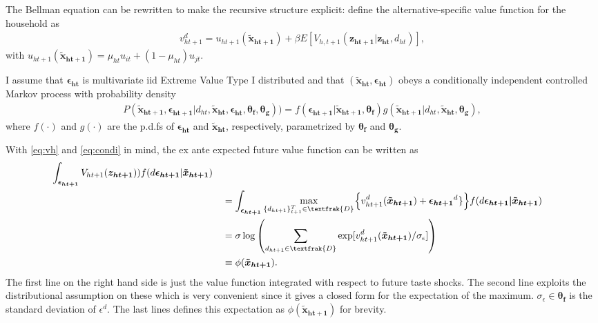 The Bellman equation can be rewritten to make the recursive structure explicit: define the alternative-specific value function for the household as
\begin{align}
v_{ht+1}^d=u_{ht+1}(\boldsymbol{\tilde{x}_{ht+1}})+\beta E[V_{h,t+1}(\boldsymbol{z_{ht+1}}|\boldsymbol{z_{ht}},d_{ht})],
\label{eq:vh}
\end{align}
with $u_{ht+1}(\boldsymbol{\tilde{x}_{ht+1}})=\mu_{ht} u_{it}+(1-\mu_{ht})u_{jt}$. 

I assume that $\boldsymbol{\epsilon_{ht}}$ is multivariate iid Extreme Value Type I distributed and that $(\boldsymbol{\tilde{x}_{ht}},\boldsymbol{\epsilon_{ht}})$ obeys a conditionally independent controlled Markov process with probability density
\begin{align}
P(\boldsymbol{\tilde{x}_{ht+1}},\boldsymbol{\epsilon_{ht+1}}|d_{ht},\boldsymbol{\tilde{x}_{ht}},\boldsymbol{\epsilon_{ht}},\boldsymbol{\theta_f},\boldsymbol{\theta_g}))=f(\boldsymbol{\epsilon_{ht+1}}|\boldsymbol{\tilde{x}_{ht+1}},\boldsymbol{\theta_f})g(\boldsymbol{\tilde{x}_{ht+1}}|d_{ht},\boldsymbol{\tilde{x}_{ht}},\boldsymbol{\theta_g}),
\label{eq:condi}
\end{align}
where $f(\cdot)$ and $g(\cdot)$ are the p.d.fs of $\boldsymbol{\epsilon_{ht}}$ and $\boldsymbol{\tilde{x}_{ht}}$, respectively, parametrized by $\boldsymbol{\theta_f}$ and $\boldsymbol{\theta_g}$.

With \eqref{eq:vh} and \eqref{eq:condi} in mind, the ex ante expected future value function can be written as
\begin{alignat*}{3}
\int_{\boldsymbol{\epsilon_{ht+1}}}{ V_{ht+1}(\boldsymbol{z_{ht+1}}))f(d\boldsymbol{\epsilon_{ht+1}}|\boldsymbol{\tilde{x}_{ht+1}})} \\
& &&= \int_{\boldsymbol{\epsilon_{ht+1}}}{ \max_{\{d_{ht+1}\}_{t+1}^{T}\in \textfrak{D}_{}} } \Big\{v_{ht+1}^{d_{}}(\boldsymbol{\tilde{x}_{ht+1}}) +\boldsymbol{\epsilon_{ht+1}}^{d_{}}\} \Big\}f(d\boldsymbol{\epsilon_{ht+1}|\tilde{x}_{ht+1}}) \\
& &&=\sigma \log {\left( \sum_{d_{ht+1} \in \textfrak{D}} { \exp[v_{ht+1}^{d_{}}(\boldsymbol{\tilde{x}_{ht+1}})/ \sigma_{\epsilon}]  } \right)} \\
& &&\equiv\phi(\boldsymbol{\tilde{x}_{ht+1}}). 
\end{alignat*}
The first line on the right hand side is just the value function integrated with respect to future taste shocks. The second line exploits the distributional assumption on these which is very convenient since it gives a closed form for the expectation of the maximum. $\sigma_{\epsilon}\in\boldsymbol{\theta_f}$ is the standard deviation of $\epsilon^d.$ The last lines defines this expectation as $\phi(\boldsymbol{\tilde{x}_{ht+1}})$ for brevity.

